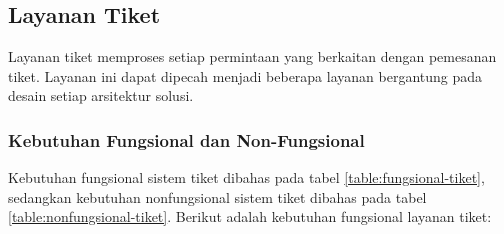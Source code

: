\pagebreak

\subsection{Layanan Tiket}

Layanan tiket memproses setiap permintaan yang berkaitan dengan pemesanan tiket. Layanan ini dapat dipecah menjadi beberapa layanan bergantung pada desain setiap arsitektur solusi.

\subsubsection{Kebutuhan Fungsional dan Non-Fungsional}

Kebutuhan fungsional sistem tiket dibahas pada tabel \ref{table:fungsional-tiket}, sedangkan kebutuhan nonfungsional sistem tiket dibahas pada tabel \ref{table:nonfungsional-tiket}. Berikut adalah kebutuhan fungsional layanan tiket:

